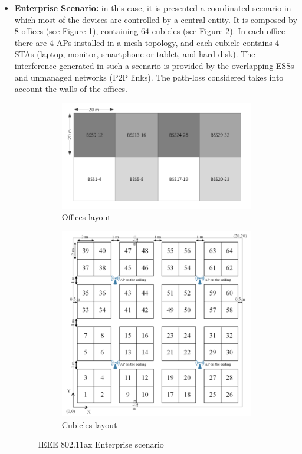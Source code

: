 \documentclass[12pt, a4paper,twoside]{tesi_upf}
\begin{document}
\begin{itemize}
			\item \textbf{Enterprise Scenario:} in this case, it is presented a coordinated scenario in which most of the devices are controlled by a central entity. It is composed by 8 offices (see Figure \ref{fig:offices}), containing 64 cubicles (see Figure \ref{fig:cubicles}). In each office there are 4 APs installed in a mesh topology, and each cubicle contains 4 STAs (laptop, monitor, smartphone or tablet, and hard disk). The interference generated in such a scenario is provided by the overlapping ESSs and unmanaged networks (P2P links). The path-loss considered takes into account the walls of the offices.
			\begin{figure}[t!]
				\centering
				\begin{subfigure}[b]{0.4\textwidth}
					\includegraphics[width=\textwidth]{images/enterprise_ax_1}
					\caption{Offices layout}
					\label{fig:offices}
				\end{subfigure}
				\begin{subfigure}[b]{0.4\textwidth}
					\includegraphics[width=\textwidth]{images/enterprise_ax_2}
					\caption{Cubicles layout}
					\label{fig:cubicles}
				\end{subfigure}		
				\caption{IEEE 802.11ax Enterprise scenario}
				\label{fig:ax_enterprise_scenario}
			\end{figure}
		

\end{itemize}
\end{document}
